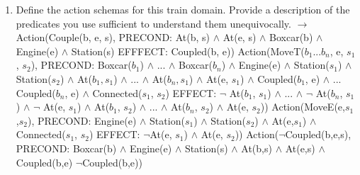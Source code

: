 \documentclass[10pt]{article}
\begin{document}
\begin{enumerate}
\begin{enumerate}
\item Define the action schemas for this train domain. Provide a description of the predicates you use sufficient to understand them unequivocally. \newline
$\rightarrow$ \newline
Action(Couple(b, e, s), \newline
\hspace*{1.0cm} PRECOND: At(b, s) $\wedge$ At(e, s) $\wedge$ Boxcar(b) $\wedge$ Engine(e) $\wedge$ Station(s) \newline
\hspace*{1.0cm} EFFFECT: Coupled(b, e)) \newline
\newline
Action(MoveT($b_1$...$b_n$, e, $s_1$, $s_2$), \newline
\hspace*{1.0cm} PRECOND: Boxcar($b_1$) $\wedge$ ... $\wedge$ Boxcar($b_n$) $\wedge$ Engine(e) $\wedge$ Station($s_1$) $\wedge$ Station($s_2$) $\wedge$ At($b_1, s_1$) $\wedge$ ...  $\wedge$ At($b_n, s_1$) $\wedge$ At(e, $s_1$) $\wedge$ Coupled($b_1$, e) $\wedge$ ... Coupled($b_n$, e) $\wedge$ Connected($s_1$, $s_2$) \newline
\hspace*{1.0cm} EFFECT: $\neg$ At($b_1$, $s_1$) $\wedge$ ... $\wedge$ $\neg$ At($b_n$, $s_1$) $\wedge$ $\neg$ At(e, $s_1$) $\wedge$ At($b_1$, $s_2$) $\wedge$ ... $\wedge$ At($b_n$, $s_2$) $\wedge$ At(e, $s_2$)) \newline
\newline
Action(MoveE(e,$s_1$,$s_2$), \newline
\hspace*{1.0cm} PRECOND: Engine(e) $\wedge$ Station($s_1$) $\wedge$ Station($s_2$) $\wedge$ At(e,$s_1$) $\wedge$ Connected($s_1$, $s_2$) \newline
\hspace*{1.0cm} EFFECT: $\neg$At(e, $s_1$) $\wedge$ At(e, $s_2$)) \newline
\newline
Action($\neg$Coupled(b,e,s), \newline
\hspace*{1.0cm} PRECOND: Boxcar(b) $\wedge$ Engine(e) $\wedge$ Station(s) $\wedge$ At(b,s) $\wedge$ At(e,s) $\wedge$ Coupled(b,e) \newline
\hspace*{1.0cm} $\neg$Coupled(b,e)) \newline


\end{enumerate}
\end{enumerate}
\end{document}

